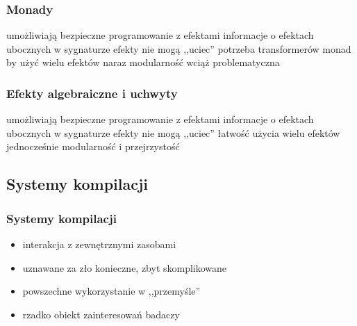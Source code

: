 \begin{frame}
  \frametitle{Monady}
  \begin{itemize}
  \pro umożliwiają bezpieczne programowanie z efektami
  \pro informacje o efektach ubocznych w sygnaturze
  \pro efekty nie mogą ,,uciec''
  \con potrzeba transformerów monad by użyć wielu efektów naraz
  \con modularność wciąż problematyczna
  \end{itemize}
\end{frame}

\begin{frame}
  \frametitle{Efekty algebraiczne i uchwyty}
  \begin{itemize}
    \pro umożliwiają bezpieczne programowanie z efektami
    \pro informacje o efektach ubocznych w sygnaturze
    \pro efekty nie mogą ,,uciec''
    \pro łatwość użycia wielu efektów jednocześnie
    \pro modularność i przejrzystość
  \end{itemize}
\end{frame}

\subsection{Systemy kompilacji}

\begin{frame}
  \frametitle{Systemy kompilacji}
  \begin{itemize}
  \item interakcja z zewnętrznymi zasobami
  \item uznawane za zło konieczne, zbyt skomplikowane
  \item powszechne wykorzystanie w ,,przemyśle''
  \item rzadko obiekt zainteresowań badaczy
  \end{itemize}
\end{frame}

